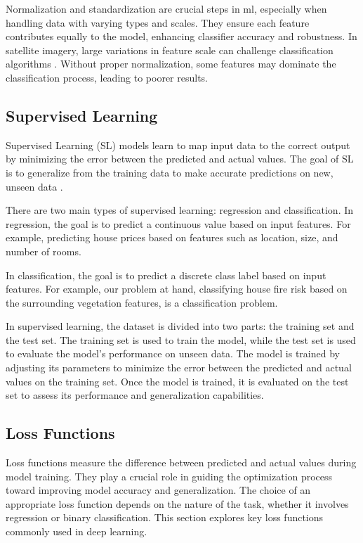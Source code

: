 Normalization and standardization are crucial steps in \gls{ml}, especially when 
handling data with varying types and scales. They ensure each feature contributes 
equally to the model, enhancing classifier accuracy and robustness. In satellite 
imagery, large variations in feature scale can challenge classification algorithms 
\cite{Adegun2023}. Without proper normalization, some features may dominate the 
classification process, leading to poorer results.

\subsection{Supervised Learning}

Supervised Learning (SL) models learn to map input data to the correct output
by minimizing the error between the predicted and actual values. The goal of
SL is to generalize from the training data to make accurate
predictions on new, unseen data \cite{geeksforgeeks_supervised_learning}.

There are two main types of supervised learning: regression and classification.
In regression, the goal is to predict a continuous value
based on input features. For example, predicting house prices based on features
such as location, size, and number of rooms.

In classification, the goal is to predict a discrete
class label based on input features. For example, our problem at hand, classifying
house fire risk based on the surrounding vegetation features, is a classification problem.

In supervised learning, the dataset is divided into two parts: the training set
and the test set. The training set is used to train the model, while the test
set is used to evaluate the model's performance on unseen data. The model is
trained by adjusting its parameters to minimize the error between the predicted
and actual values on the training set. Once the model is trained, it is evaluated
on the test set to assess its performance and generalization capabilities.


\subsection{Loss Functions}
Loss functions measure the difference between predicted and actual values during model training.
They play a crucial role in guiding the optimization process toward improving model accuracy and 
generalization. The choice of an appropriate loss function depends on the nature of the task, 
whether it involves regression or binary classification. This section explores key loss 
functions commonly used in deep learning.

